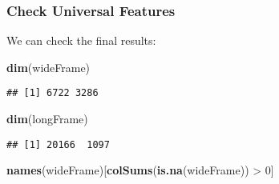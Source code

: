\documentclass[10pt]{report}
\newenvironment{Shaded}{}{}
\newcommand{\KeywordTok}[1]{\textcolor[rgb]{0.00,0.44,0.13}{\textbf{{#1}}}}
\newcommand{\DecValTok}[1]{\textcolor[rgb]{0.25,0.63,0.44}{{#1}}}
\newcommand{\StringTok}[1]{\textcolor[rgb]{0.25,0.44,0.63}{{#1}}}
\newcommand{\NormalTok}[1]{{#1}}
\begin{document}
\begin{Shaded}
\end{Shaded}

\subsubsection{Check Universal
Features}\label{check-universal-features-2}

We can check the final results:

\begin{Shaded}
\begin{Highlighting}[]
\KeywordTok{dim}\NormalTok{(wideFrame)}
\end{Highlighting}
\end{Shaded}

\begin{verbatim}
## [1] 6722 3286
\end{verbatim}

\begin{Shaded}
\begin{Highlighting}[]
\KeywordTok{dim}\NormalTok{(longFrame)}
\end{Highlighting}
\end{Shaded}

\begin{verbatim}
## [1] 20166  1097
\end{verbatim}

\begin{Shaded}
\begin{Highlighting}[]
\KeywordTok{names}\NormalTok{(wideFrame)[}\KeywordTok{colSums}\NormalTok{(}\KeywordTok{is.na}\NormalTok{(wideFrame)) >}\StringTok{ }\DecValTok{0}\NormalTok{]}
\end{Highlighting}
\end{Shaded}
\end{document}
